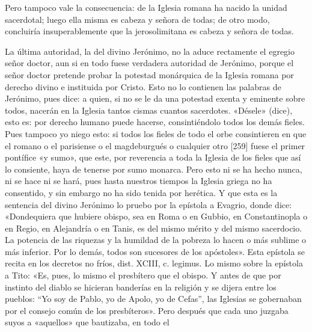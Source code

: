 Pero tampoco vale la consecuencia: de la Iglesia romana ha nacido la unidad sacerdotal; luego ella misma es cabeza y señora de todas; de otro modo, concluiría insuperablemente que la jerosolimitana es cabeza y señora de todas.

La última autoridad, la del divino Jerónimo, no la aduce rectamente el egregio señor doctor, aun si en todo fuese verdadera autoridad de Jerónimo, porque el señor doctor pretende probar la potestad monárquica de la Iglesia romana por derecho divino e instituida por Cristo. Esto no lo contienen las palabras de Jerónimo, pues dice: a quien, si no se le da una potestad exenta y eminente sobre todos, nacerán en la Iglesia tantos cismas cuantos sacerdotes. «Désele» (dice), esto es: por derecho humano puede hacerse, consintiéndolo todos los demás fieles. Pues tampoco yo niego esto: si todos los fieles de todo el orbe consintieren en que el romano o el parisiense o el magdeburgués o cualquier otro [259] fuese el primer pontífice «y sumo», que este, por reverencia a toda la Iglesia de los fieles que así lo consiente, haya de tenerse por sumo monarca. Pero esto ni se ha hecho nunca, ni se hace ni se hará, pues hasta nuestros tiempos la Iglesia griega no ha consentido, y sin embargo no ha sido tenida por herética. Y que esta es la sentencia del divino Jerónimo lo pruebo por la epístola a Evagrio, donde dice: «Dondequiera que hubiere obispo, sea en Roma o en Gubbio, en Constantinopla o en Regio, en Alejandría o en Tanis, es del mismo mérito y del mismo sacerdocio. La potencia de las riquezas y la humildad de la pobreza lo hacen o más sublime o más inferior. Por lo demás, todos son sucesores de los apóstoles». Esta epístola se recita en los decretos no fríos, dist. XCIII, c. legimus. Lo mismo sobre la epístola a Tito: «Es, pues, lo mismo el presbítero que el obispo. Y antes de que por instinto del diablo se hicieran banderías en la religión y se dijera entre los pueblos: “Yo soy de Pablo, yo de Apolo, yo de Cefas”, las Iglesias se gobernaban por el consejo común de los presbíteros». Pero después que cada uno juzgaba suyos a «aquellos» que bautizaba, en todo el 